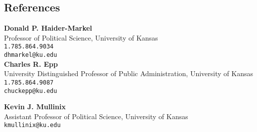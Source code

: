 \documentclass[margin,line,pifont,palatino,courier]{res}
\begin{document}
\begin{resume}
\section{\sc References}

\textbf{Donald P. Haider-Markel} \\
Professor of Political Science, University of Kansas \\
\verb+1.785.864.9034+\\
\texttt{dhmarkel@ku.edu}\\



\textbf{Charles R. Epp} \\
University Distinguished Professor of Public Administration, University of Kansas \\
\verb+1.785.864.9087+\\
\texttt{chuckepp@ku.edu}

\textbf{Kevin J. Mullinix} \\
Assistant Professor of Political Science, University of Kansas \\
\texttt{kmullinix@ku.edu}\\

\end{resume}
\end{document}
